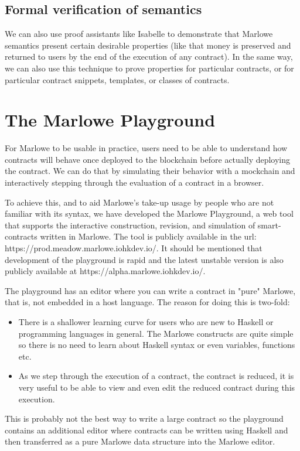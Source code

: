 \documentclass[runningheads]{llncs}
\begin{document}
\subsection{Formal verification of semantics\label{subsec:verification}}

We can also use proof assistants like Isabelle to demonstrate that Marlowe semantics present certain desirable properties (like that money is preserved and returned to users by the end of the execution of any contract). In the same way, we can also use this technique to prove properties for particular contracts, or for particular contract snippets, templates, or classes of contracts.

\clearpage
\section{The Marlowe Playground}

For Marlowe to be usable in practice, users need to be able to understand how contracts will behave once deployed to the blockchain before actually deploying the contract. We can do that by simulating their behavior with a mockchain and interactively stepping through the evaluation of a contract in a browser.

To achieve this, and to aid Marlowe’s take-up usage by people who are not familiar with its syntax, we have developed the Marlowe Playground, a web tool that supports the interactive construction, revision, and simulation of smart-contracts written in Marlowe. The tool is publicly available in the url: https://prod.meadow.marlowe.iohkdev.io/. It should be mentioned that development of the playground is rapid and the latest unstable version is also publicly available at https://alpha.marlowe.iohkdev.io/.

The playground has an editor where you can write a contract in "pure" Marlowe, that is, not embedded in a host language. The reason for doing this is two-fold:
\begin{itemize}
    \item There is a shallower learning curve for users who are new to Haskell or programming languages in general. The Marlowe constructs are quite simple so there is no need to learn about Haskell syntax or even variables, functions etc.
    \item As we step through the execution of a contract, the contract is reduced, it is very useful to be able to view and even edit the reduced contract during this execution.
\end{itemize}
This is probably not the best way to write a large contract so the playground contains an additional editor where contracts can be written using Haskell and then transferred as a pure Marlowe data structure into the Marlowe editor.
\end{document}
